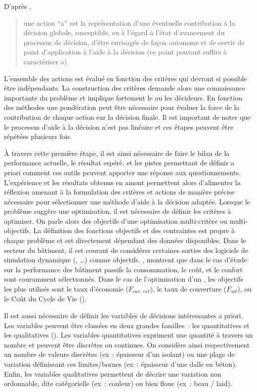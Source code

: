 \noindent D’après \textcite{Roy1985}, \blockquote{une action \enquote{a} est la représentation d’une
éventuelle contribution à la décision globale, susceptible, eu à l’égard à l’état
d’avancement du processus de décision, d’être envisagée de façon autonome et de servir de
point d’application à l’aide à la décision (ce point pouvant suffire à caractériser a).}
L’ensemble des actions est évalué en fonction des critères qui devront si possible être
indépendants. La construction des critères demande alors une connaissance importante du
problème et implique fortement le ou les décideurs. En fonction des méthodes une
pondération peut être nécessaire pour évaluer la force de la contribution de chaque action
sur la décision finale. Il est important de noter que le processus d’aide à la décision
n’est pas linéaire et ces étapes peuvent être répétées plusieurs fois.

À travers cette première étape, il est ainsi nécessaire de faire le bilan de la
performance actuelle, le résultat espéré, et les pistes permettant de définir a priori
comment ces outils peuvent apporter une réponse aux questionnements. L’expérience et les
résultats obtenus en amont permettent alors d’alimenter la réflexion amenant à la
formulation des critères et actions de manière précise nécessaire pour sélectionner une
méthode d’aide à la décision adaptée. Lorsque le problème suggère une optimisation, il est
nécessaire de définir les critères à optimiser. On parle alors des objectifs d’une
optimisation multi-critère ou multi-objectifs. La définition des fonctions objectifs et des
contraintes est propre à chaque problème et est directement dépendant des données
disponibles. Dans le secteur du bâtiment, il est courant de considérer certaines sorties
des logiciels de simulation dynamique (, \dots) comme objectifs.
\textcite{Attia2013110}, montrent que dans le cas d’étude sur la performance des bâtiment
passifs la consommation, le coût, et le confort sont couramment sélectionnés. Dans le cas
de l’optimisation d’un , les objectifs les plus utilisés sont le taux d’économie ($F_{sav,\, ext}$),
le taux de couverture ($F_{sol}$), ou le Coût du Cycle de Vie ().

Il est aussi nécessaire de définir les variables de décisions intéressantes a priori.
Les variables peuvent être classées en deux grandes familles~: les quantitatives et
les qualitatives ().
Les variables quantitatives expriment une quantité à travers un nombre et
peuvent être discrètes ou continues. On considère ainsi respectivement un nombre de
valeurs discrètes (ex~: épaisseur d’un isolant) ou une plage de variation définissant
ces limites/bornes (ex~: épaisseur d’une dalle en béton).
Enfin, les variables qualitatives permettent de décrire une variation non ordonnable,
dite catégorielle (ex~: couleur) ou bien floue (ex~: beau / laid).

